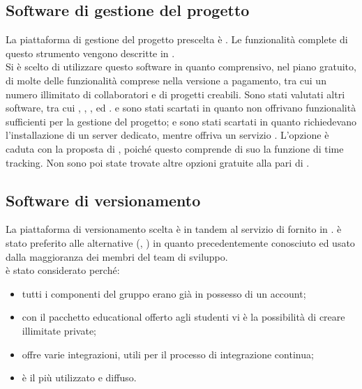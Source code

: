 \subsection{Software di gestione del progetto}
La piattaforma di gestione del progetto prescelta è \textbf{}. Le funzionalità complete di questo strumento vengono descritte in .\\
Si è scelto di utilizzare questo software in quanto comprensivo, nel piano gratuito, di molte delle funzionalità comprese nella versione a pagamento, tra cui un numero illimitato di collaboratori e di progetti creabili. Sono stati valutati altri software, tra cui , , ,  ed .  e  sono stati scartati in quanto non offrivano funzionalità sufficienti per la gestione del progetto;  e  sono stati scartati in quanto richiedevano l'installazione di un server dedicato, mentre  offriva un servizio . L'opzione  è caduta con la proposta di , poiché questo comprende di suo la funzione di time tracking. Non sono poi state trovate altre opzioni gratuite alla pari di .

\subsection{Software di versionamento}
La piattaforma di versionamento scelta è  in tandem al servizio di  fornito in .  è stato preferito alle alternative (, ) in quanto precedentemente conosciuto ed usato dalla maggioranza dei membri del team di sviluppo.\\
 è stato considerato perché:
\begin{itemize}
	\item tutti i componenti del gruppo erano già in possesso di un account;
	\item con il pacchetto educational offerto agli studenti vi è la possibilità di creare illimitate  private;
	\item offre varie integrazioni, utili per il processo di integrazione continua;
	\item è il più utilizzato e diffuso.
\end{itemize}

